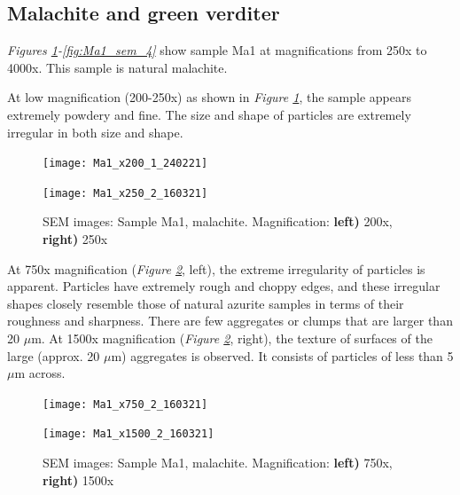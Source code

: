 \subsection[Malachite and green verditer]{Malachite and green verditer}
\label{subsection3.1.2}


\textit{Figures \ref{fig:Ma1_sem_1}-\ref{fig:Ma1_sem_4}} show sample Ma1 at magnifications from 250x to 4000x. This sample is natural malachite.

At low magnification (200-250x) as shown in \textit{Figure \ref{fig:Ma1_sem_1}}, the sample appears extremely powdery and fine. The size and shape of particles are extremely irregular in both size and shape. 

\begin{figure}[H]
\centering
\begin{minipage}{.45\textwidth}
  \centering
  \texttt{[image: Ma1\_x200\_1\_240221]}
\end{minipage}
\begin{minipage}{.45\textwidth}
  \centering
  \texttt{[image: Ma1\_x250\_2\_160321]}
\end{minipage}
\caption[SEM images: Sample Ma1, malachite]{SEM images: Sample Ma1, malachite. Magnification: \textbf{left)} 200x, \textbf{right)} 250x}
\label{fig:Ma1_sem_1}
\end{figure}

At 750x magnification (\textit{Figure \ref{fig:Ma1_sem_2}}, left), the extreme irregularity of particles is apparent. Particles have extremely rough and choppy edges, and these irregular shapes closely resemble those of natural azurite samples in terms of their roughness and sharpness. There are few aggregates or clumps that are larger than 20 $\mu$m. At 1500x magnification (\textit{Figure \ref{fig:Ma1_sem_2}}, right), the texture of surfaces of the large (approx. 20 $\mu$m) aggregates is observed. It consists of particles of less than 5 $\mu$m across. 
\begin{figure}[H]
\centering
\begin{minipage}{.45\textwidth}
  \centering
  \texttt{[image: Ma1\_x750\_2\_160321]}
\end{minipage}
\begin{minipage}{.45\textwidth}
  \centering
  \texttt{[image: Ma1\_x1500\_2\_160321]}
\end{minipage}
\caption[SEM images: Sample Ma1, malachite]{SEM images: Sample Ma1, malachite. Magnification: \textbf{left)} 750x, \textbf{right)} 1500x}
\label{fig:Ma1_sem_2}
\end{figure}

